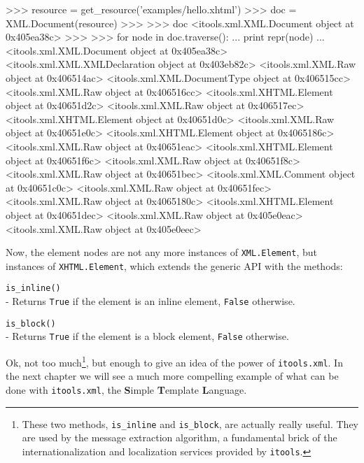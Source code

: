 \begin{code}
    >>> resource = get_resource('examples/hello.xhtml')
    >>> doc = XML.Document(resource)
    >>> 
    >>> doc
    <itools.xml.XML.Document object at 0x405ea38c>
    >>> 
    >>> for node in doc.traverse():
    ...     print repr(node)
    ... 
    <itools.xml.XML.Document object at 0x405ea38c>
    <itools.xml.XML.XMLDeclaration object at 0x403eb82c>
    <itools.xml.XML.Raw object at 0x406514ac>
    <itools.xml.XML.DocumentType object at 0x406515cc>
    <itools.xml.XML.Raw object at 0x406516cc>
    <itools.xml.XHTML.Element object at 0x40651d2c>
    <itools.xml.XML.Raw object at 0x406517ec>
    <itools.xml.XHTML.Element object at 0x40651d0c>
    <itools.xml.XML.Raw object at 0x40651e0c>
    <itools.xml.XHTML.Element object at 0x4065186c>
    <itools.xml.XML.Raw object at 0x40651eac>
    <itools.xml.XHTML.Element object at 0x40651f6c>
    <itools.xml.XML.Raw object at 0x40651f8c>
    <itools.xml.XML.Raw object at 0x40651bec>
    <itools.xml.XML.Comment object at 0x40651c0c>
    <itools.xml.XML.Raw object at 0x40651fec>
    <itools.xml.XML.Raw object at 0x4065180c>
    <itools.xml.XHTML.Element object at 0x40651dec>
    <itools.xml.XML.Raw object at 0x405e0eac>
    <itools.xml.XML.Raw object at 0x405e0eec>
\end{code}

Now, the element nodes are not any more instances of {\tt XML.Element}, but
instances of {\tt XHTML.Element}, which extends the generic API with the
methods:

\begin{api}
    {\tt is\_inline()}\\
    - Returns {\tt True} if the element is an inline element, {\tt False}
    otherwise.

    {\tt is\_block()}\\
    - Returns {\tt True} if the element is a block element, {\tt False}
    otherwise.
\end{api}

Ok, not too much\footnote{These two methods, {\tt is\_inline} and
{\tt is\_block}, are actually really useful. They are used by the message
extraction algorithm, a fundamental brick of the internationalization and
localization services provided by {\tt itools}.}, but enough to give an
idea of the power of {\tt itools.xml}. In the next chapter we will see a
much more compelling example of what can be done with {\tt itools.xml},
the {\bf S}imple {\bf T}emplate {\bf L}anguage.


